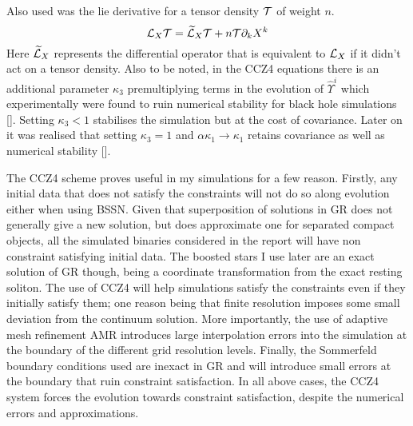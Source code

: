 Also used was the lie derivative for a tensor density $\mathcal{T}$ of weight $n$.\[ \mathcal{L}_X \mathcal{T} = \widetilde{\mathcal{L}}_X \mathcal{T} + n\mathcal{T} \partial_k X^k\]
Here $ \widetilde{\mathcal{L}}_X$ represents the differential operator that is equivalent to $\mathcal{L}_X$ if it didn't act on a tensor density. Also to be noted, in the CCZ4 equations there is an additional parameter $\kappa_3$ premultiplying terms in the evolution of $\hat{\Upsilon}^i$ which experimentally were found to ruin numerical stability for black hole simulations []. Setting $\kappa_3<1$ stabilises the simulation but at the cost of covariance. Later on it was realised that setting $\kappa_3=1$ and $\alpha\kappa_1\rightarrow\kappa_1$ retains covariance as well as numerical stability [].

The CCZ4 scheme proves useful in my simulations for a few reason. Firstly, any initial data that does not satisfy the constraints will not do so along evolution either when using BSSN. Given that superposition of solutions in GR does not generally give a new solution, but does approximate one for separated compact objects, all the simulated binaries considered in the report will have non constraint satisfying initial data. The boosted stars I use later are an exact solution of GR though, being a coordinate transformation from the exact resting soliton. The use of CCZ4 will help simulations satisfy the constraints even if they initially satisfy them; one reason being that finite resolution imposes some small deviation from the continuum solution. More importantly, the use of adaptive mesh refinement AMR introduces large interpolation errors into the simulation at the boundary of the different grid resolution levels. Finally, the Sommerfeld boundary conditions used are inexact in GR and will introduce small errors at the boundary that ruin constraint satisfaction. In all above cases, the CCZ4 system forces the evolution towards constraint satisfaction, despite the numerical errors and approximations.


